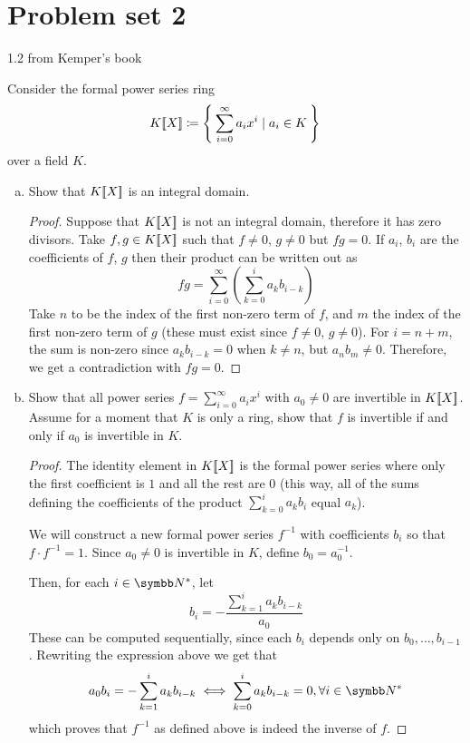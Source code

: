 \section*{Problem set 2}

\begin{problem*}{1.2 from Kemper's book}
\newcommand{\KX}{\powerseriesring{K}{X}}

Consider the formal power series ring
\[\KX \coloneqq \Set{ \sum_{i=0}^{\infty} a_i x^i \mid a_i \in K }\]
over a field \(K\).

\begin{enumerate}[(a)]
    \item Show that \(\KX\) is an integral domain.
    \begin{proof}
        Suppose that \(\KX\) is not an integral domain, therefore it has zero divisors. Take \(f, g \in \KX\) such that \(f \neq 0\), \(g \neq 0\) but \(f g = 0\). If \(a_i\), \(b_i\) are the coefficients of \(f\), \(g\) then their product can be written out as
        \[
            fg = \sum_{i = 0}^{\infty}
            \left(
                \sum_{k = 0}^{i} a_k b_{i - k}
            \right)
        \]
        Take \(n\) to be the index of the first non-zero term of \(f\), and \(m\) the index of the first non-zero term of \(g\) (these must exist since \(f \neq 0\), \(g \neq 0\)). For \(i = n + m\), the sum is non-zero since \(a_{k} b_{i - k} = 0\) when \(k \neq n\), but \(a_{n} b_{m} \neq 0\). Therefore, we get a contradiction with \(f g = 0\).
    \end{proof}
    
    \item Show that all power series \(f = \sum_{i = 0}^{\infty} a_i x^i\) with \(a_0 \neq 0\) are invertible in \(\KX\). Assume for a moment that \(K\) is only a ring, show that \(f\) is invertible if and only if \(a_0\) is invertible in \(K\).
    \begin{proof}
    The identity element in \(\KX\) is the formal power series where only the first coefficient is \(1\) and all the rest are \(0\) (this way, all of the sums defining the coefficients of the product \(\sum_{k = 0}^{i} a_k b_i\) equal \(a_k\)).
    
    We will construct a new formal power series \(f^{-1}\) with coefficients \(b_i\) so that \(f \cdot f^{-1} = 1\). Since \(a_0 \neq 0\) is invertible in \(K\), define \(b_0 = a_0^{-1}\).
    
    Then, for each \(i \in \naturals^*\), let
    \[
        b_i = -\frac{\sum_{k = 1}^{i} a_k b_{i-k}}{a_0}
    \]
    These can be computed sequentially, since each \(b_i\) depends only on \(b_{0}, \dots, b_{i-1}\). Rewriting the expression above we get that
    \[
        a_0 b_i = - \sum_{k = 1}^{i} a_k b_{i-k} \iff \sum_{k=0}^{i} a_k b_{i-k} = 0, \forall i \in \naturals^*
    \]
    which proves that \(f^{-1}\) as defined above is indeed the inverse of \(f\).
    

\end{proof}
\end{enumerate}
\end{problem*}
